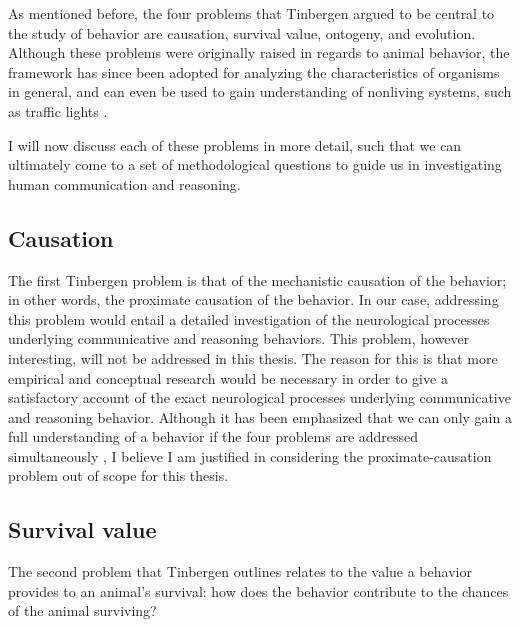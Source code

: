 As mentioned before, the four problems that Tinbergen argued to be central to the study of behavior are causation, survival value, ontogeny, and evolution.
Although these problems were originally raised in regards to animal behavior, the framework has since been adopted for analyzing the characteristics of organisms in general, and can even be used to gain understanding of nonliving systems, such as traffic lights \citep{BatesonLaland13}.

I will now discuss each of these problems in more detail, such that we can ultimately come to a set of methodological questions to guide us in investigating human communication and reasoning.


\subsection{Causation}
The first Tinbergen problem is that of the mechanistic causation of the behavior; in other words, the proximate causation of the behavior. In our case, addressing this problem would entail a detailed investigation of the neurological processes underlying communicative and reasoning behaviors.
This problem, however interesting, will not be addressed in this thesis. The reason for this is that more empirical and conceptual research would be necessary in order to give a satisfactory account of the exact neurological processes underlying communicative and reasoning behavior. Although it has been emphasized that we can only gain a full understanding of a behavior if the four problems are addressed simultaneously \citep{Tinbergen63, BatesonLaland13}, I believe I am justified in considering the proximate-causation problem out of scope for this thesis.

\subsection{Survival value}
The second problem that Tinbergen outlines relates to the value a behavior provides to an animal's survival: how does the behavior contribute to the chances of the animal surviving?

